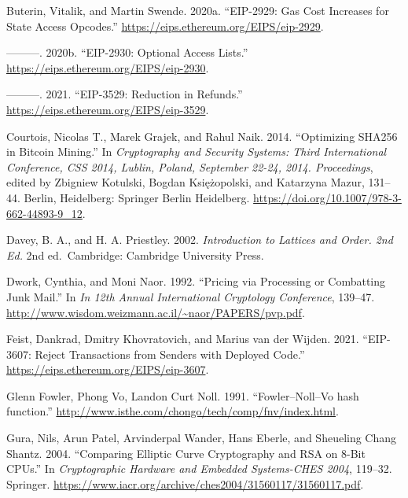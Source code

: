 \documentclass[
]{ltjsarticle}
\newlength{\cslhangindent}
\newlength{\cslentryspacingunit} %
\newenvironment{CSLReferences}[2] %
 {%
  \setlength{\parindent}{0pt}
  \ifodd #1
  \let\oldpar\par
  \def\par{\hangindent=\cslhangindent\oldpar}
  \fi
  \setlength{\parskip}{#2\cslentryspacingunit}
 }%
 {}
\begin{document}
\begin{CSLReferences}{1}{0}
\leavevmode{}%
Buterin, Vitalik, and Martin Swende. 2020a. ``EIP-2929: Gas Cost
Increases for State Access Opcodes.''
\url{https://eips.ethereum.org/EIPS/eip-2929}.

\leavevmode{}%
---------. 2020b. ``EIP-2930: Optional Access Lists.''
\url{https://eips.ethereum.org/EIPS/eip-2930}.

\leavevmode{}%
---------. 2021. ``EIP-3529: Reduction in Refunds.''
\url{https://eips.ethereum.org/EIPS/eip-3529}.

\leavevmode{}%
Courtois, Nicolas T., Marek Grajek, and Rahul Naik. 2014. ``Optimizing
SHA256 in Bitcoin Mining.'' In \emph{Cryptography and Security Systems:
Third International Conference, CSS 2014, Lublin, Poland, September
22-24, 2014. Proceedings}, edited by Zbigniew Kotulski, Bogdan
Księżopolski, and Katarzyna Mazur, 131--44. Berlin, Heidelberg: Springer
Berlin Heidelberg. \url{https://doi.org/10.1007/978-3-662-44893-9_12}.

\leavevmode{}%
Davey, B. A., and H. A. Priestley. 2002. \emph{Introduction to Lattices
and Order. 2nd Ed.} 2nd ed.~Cambridge: Cambridge University Press.

\leavevmode{}%
Dwork, Cynthia, and Moni Naor. 1992. ``Pricing via Processing or
Combatting Junk Mail.'' In \emph{In 12th Annual International Cryptology
Conference}, 139--47.
\url{http://www.wisdom.weizmann.ac.il/~naor/PAPERS/pvp.pdf}.

\leavevmode{}%
Feist, Dankrad, Dmitry Khovratovich, and Marius van der Wijden. 2021.
``EIP-3607: Reject Transactions from Senders with Deployed Code.''
\url{https://eips.ethereum.org/EIPS/eip-3607}.

\leavevmode{}%
Glenn Fowler, Phong Vo, Landon Curt Noll. 1991. ``{Fowler--Noll--Vo hash
function}.'' \url{http://www.isthe.com/chongo/tech/comp/fnv/index.html}.

\leavevmode{}%
Gura, Nils, Arun Patel, Arvinderpal Wander, Hans Eberle, and Sheueling
Chang Shantz. 2004. ``Comparing Elliptic Curve Cryptography and RSA on
8-Bit CPUs.'' In \emph{Cryptographic Hardware and Embedded Systems-CHES
2004}, 119--32. Springer.
\url{https://www.iacr.org/archive/ches2004/31560117/31560117.pdf}.


\end{CSLReferences}
\end{document}
